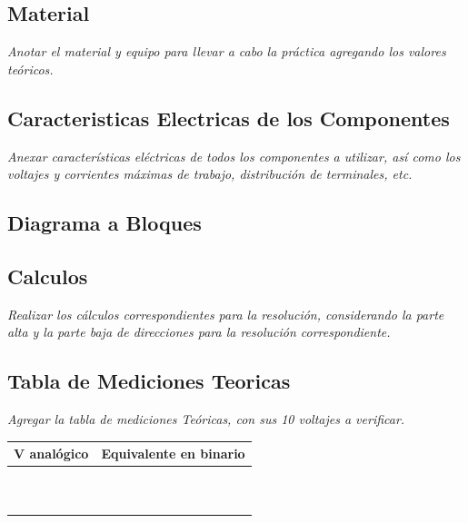\documentclass[11pt]{scrartcl}
\newcommand{\indicacion}[1]{\noindent\textit{\small #1}}
\begin{document}
\subsection{Material}

\indicacion{
    Anotar el material y equipo para llevar a cabo la práctica agregando los valores teóricos.
}

\subsection{Caracteristicas Electricas de los Componentes}
\indicacion{
    Anexar características eléctricas de todos los componentes a utilizar, así como los voltajes y corrientes máximas de trabajo, distribución de terminales, etc.
}

\subsection{Diagrama a Bloques}

\subsection{Calculos}
\indicacion{
    Realizar los cálculos correspondientes para la resolución, considerando la parte alta y la parte baja de direcciones para la resolución correspondiente.
}

\subsection{Tabla de Mediciones Teoricas}
\indicacion{
    Agregar la tabla de mediciones Teóricas, con sus 10 voltajes a verificar.
}

\begin{center}
\begin{tabular}{|c|c|}
\hline
\textbf{V analógico}& \textbf{Equivalente en binario}\\
\hline
& \\
\hline
& \\
\hline
& \\
\hline
& \\
\hline
& \\
\hline
& \\
\hline
& \\
\hline
& \\
\hline
& \\
\hline
& \\
\hline
\end{tabular}
\end{center}
\end{document}
